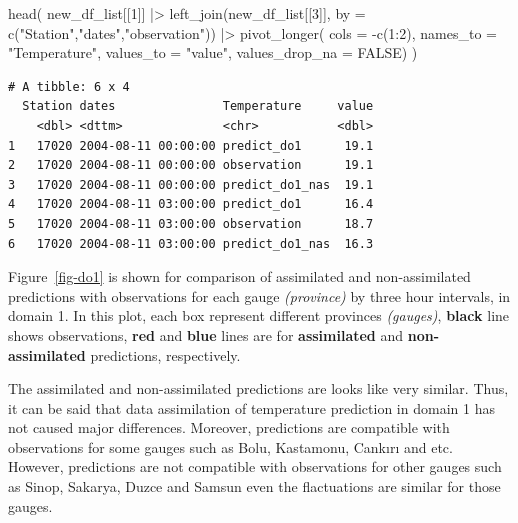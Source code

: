 \documentclass[
  letterpaper,
  DIV=11,
  numbers=noendperiod,
  abstract]{scrartcl}
\newenvironment{Shaded}{\begin{snugshade}}{\end{snugshade}}
\newcommand{\AttributeTok}[1]{\textcolor[rgb]{0.40,0.45,0.13}{#1}}
\newcommand{\ConstantTok}[1]{\textcolor[rgb]{0.56,0.35,0.01}{#1}}
\newcommand{\DecValTok}[1]{\textcolor[rgb]{0.68,0.00,0.00}{#1}}
\newcommand{\FunctionTok}[1]{\textcolor[rgb]{0.28,0.35,0.67}{#1}}
\newcommand{\NormalTok}[1]{\textcolor[rgb]{0.00,0.23,0.31}{#1}}
\newcommand{\SpecialCharTok}[1]{\textcolor[rgb]{0.37,0.37,0.37}{#1}}
\newcommand{\StringTok}[1]{\textcolor[rgb]{0.13,0.47,0.30}{#1}}
\begin{document}
\begin{Shaded}
\begin{Highlighting}[]
\FunctionTok{head}\NormalTok{(}
\NormalTok{  new\_df\_list[[}\DecValTok{1}\NormalTok{]] }\SpecialCharTok{|\textgreater{}}        
    \FunctionTok{left\_join}\NormalTok{(new\_df\_list[[}\DecValTok{3}\NormalTok{]], }\AttributeTok{by =} \FunctionTok{c}\NormalTok{(}\StringTok{"Station"}\NormalTok{,}\StringTok{"dates"}\NormalTok{,}\StringTok{"observation"}\NormalTok{)) }\SpecialCharTok{|\textgreater{}} 
    \FunctionTok{pivot\_longer}\NormalTok{(}
            \AttributeTok{cols =} \SpecialCharTok{{-}}\FunctionTok{c}\NormalTok{(}\DecValTok{1}\SpecialCharTok{:}\DecValTok{2}\NormalTok{),}
            \AttributeTok{names\_to =} \StringTok{"Temperature"}\NormalTok{,}
            \AttributeTok{values\_to =} \StringTok{"value"}\NormalTok{,}
            \AttributeTok{values\_drop\_na =} \ConstantTok{FALSE}\NormalTok{) )  }
\end{Highlighting}
\end{Shaded}

\begin{verbatim}
# A tibble: 6 x 4
  Station dates               Temperature     value
    <dbl> <dttm>              <chr>           <dbl>
1   17020 2004-08-11 00:00:00 predict_do1      19.1
2   17020 2004-08-11 00:00:00 observation      19.1
3   17020 2004-08-11 00:00:00 predict_do1_nas  19.1
4   17020 2004-08-11 03:00:00 predict_do1      16.4
5   17020 2004-08-11 03:00:00 observation      18.7
6   17020 2004-08-11 03:00:00 predict_do1_nas  16.3
\end{verbatim}

Figure~\ref{fig-do1} is shown for comparison of assimilated and
non-assimilated predictions with observations for each gauge
\emph{(province)} by three hour intervals, in domain 1. In this plot,
each box represent different provinces \emph{(gauges)}, \textbf{black}
line shows observations, \textbf{red} and \textbf{blue} lines are for
\textbf{assimilated} and \textbf{non-assimilated} predictions,
respectively.

The assimilated and non-assimilated predictions are looks like very
similar. Thus, it can be said that data assimilation of temperature
prediction in domain 1 has not caused major differences. Moreover,
predictions are compatible with observations for some gauges such as
Bolu, Kastamonu, Cankırı and etc. However, predictions are not
compatible with observations for other gauges such as Sinop, Sakarya,
Duzce and Samsun even the flactuations are similar for those gauges.
\end{document}
